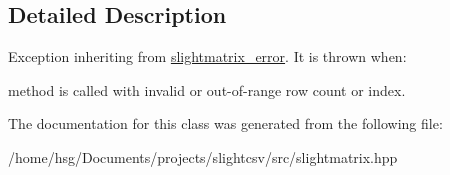 \subsection{Detailed Description}
Exception inheriting from \hyperlink{classutils_1_1slightmatrix__error}{slightmatrix\+\_\+error}. It is thrown when\+:
\begin{DoxyItemize}
\item method is called with invalid or out-\/of-\/range row count or index. 
\end{DoxyItemize}

The documentation for this class was generated from the following file\+:\begin{DoxyCompactItemize}
\item 
/home/hsg/\+Documents/projects/slightcsv/src/slightmatrix.\+hpp\end{DoxyCompactItemize}
